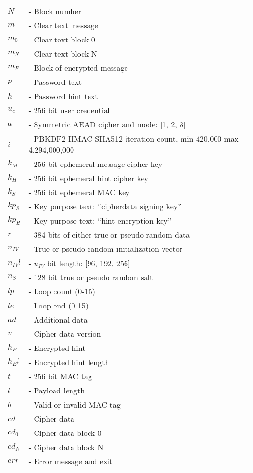 \documentclass{article}
\begin{document}
\begin{tabular}{@{}p{2mm} l}
$N$ & \textrm{ - Block number}\\
$m$ & \textrm{ - Clear text message}\\
$m_0$ & \textrm{ - Clear text block 0}\\
$m_N$ & \textrm{ - Clear text block N}\\
$m_{E}$ & \textrm{ - Block of encrypted message}\\
$p$ & \textrm{ - Password text}\\
$h$ & \textrm{ - Password hint text}\\
$u_c$ & \textrm{ - 256 bit user credential}\\
$a$ & \textrm{ - Symmetric AEAD cipher and mode: [1, 2, 3]}\\
$i$ & \textrm{ - PBKDF2-HMAC-SHA512 iteration count, min 420,000 max 4,294,000,000}\\
$k_M$ & \textrm{ - 256 bit ephemeral message cipher key}\\
$k_H$ & \textrm{ - 256 bit ephemeral hint cipher key}\\
$k_S$ & \textrm{ - 256 bit ephemeral MAC key}\\
$kp_S$ & \textrm{ - Key purpose text: ``cipherdata signing key''}\\
$kp_H$ & \textrm{ - Key purpose text: ``hint encryption key''}\\
$r$ & \textrm{ - 384 bits of either true or pseudo random data}\\
$n_{IV}$ & \textrm{ - True or pseudo random initialization vector}\\
$n_{IV}l$ & \textrm{ - }$n_{IV}$\textrm{ bit length: [96, 192, 256]}\\
$n_S$ & \textrm{ - 128 bit true or pseudo random salt}\\
$lp$ & \textrm{ - Loop count (0-15)}\\
$le$ & \textrm{ - Loop end (0-15)}\\
$ad$ & \textrm{ - Additional data}\\
$v$ & \textrm{ - Cipher data version}\\
$h_E$ & \textrm{ - Encrypted hint}\\
$h_El$ & \textrm{ - Encrypted hint length}\\
$t$ & \textrm{ - 256 bit MAC tag}\\
$l$ & \textrm{ - Payload length}\\
$b$ & \textrm{ - Valid or invalid MAC tag}\\
$cd$ & \textrm{ - Cipher data}\\
$cd_0$ & \textrm{ - Cipher data block 0}\\
$cd_N$ & \textrm{ - Cipher data block N}\\
$err$ & \textrm{ - Error message and exit}\\
\end{tabular}
\end{document}
